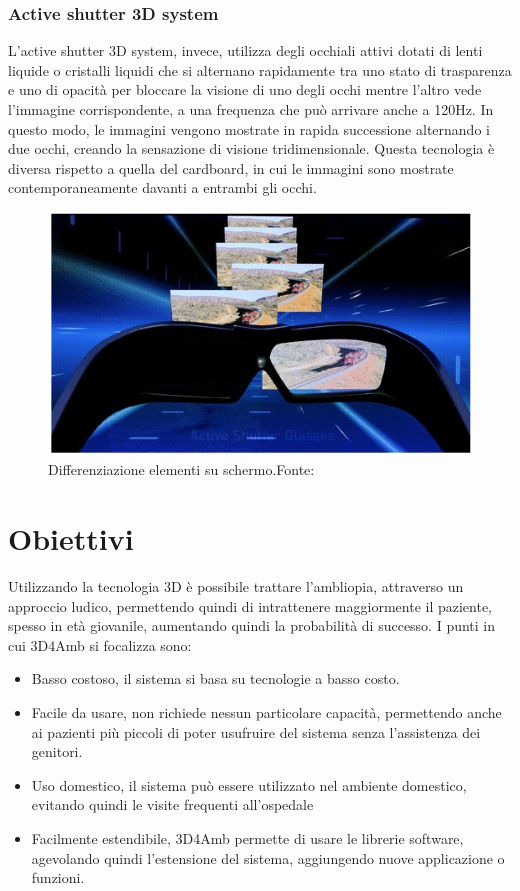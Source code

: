 \documentclass[
a4paper,
cleardoublepage=empty,
headings=twolinechapter,
numbers=autoenddot,
]{scrbook}
\begin{document}
	\subsubsection{Active shutter 3D system}
	   L'active shutter 3D system, invece, utilizza degli occhiali attivi dotati di lenti liquide o cristalli liquidi che si alternano rapidamente tra uno stato di trasparenza e uno di opacità per bloccare la visione di uno degli occhi mentre l'altro vede l'immagine corrispondente, a una frequenza che può arrivare anche a 120Hz. In questo modo, le immagini vengono mostrate in rapida successione alternando i due occhi, creando la sensazione di visione tridimensionale. Questa tecnologia è diversa rispetto a quella del cardboard, in cui le immagini sono mostrate contemporaneamente davanti a entrambi gli occhi.
		\begin{figure}[H]
		\centering
		\includegraphics[width=0.6\linewidth]{image/active-shutter-3d-technology}
		\caption{Differenziazione elementi su schermo.Fonte:\cite{active-shutter-3d_image}}
		\label{fig:occhiali active-shutter-3d-technology}
	\end{figure}

	\section{Obiettivi}
	Utilizzando la tecnologia 3D è possibile trattare l'ambliopia, attraverso un approccio ludico, permettendo quindi di intrattenere maggiormente il paziente, spesso in età giovanile, aumentando quindi la probabilità di successo.
	I punti in cui 3D4Amb si focalizza sono:
	\begin{itemize}
		\item Basso costoso, il sistema si basa su tecnologie a basso costo.
		\item Facile da usare, non richiede nessun particolare capacità, permettendo anche ai pazienti più piccoli di poter usufruire del sistema senza l'assistenza dei genitori.
		\item Uso domestico, il sistema può essere utilizzato nel ambiente domestico, evitando quindi le visite frequenti all'ospedale
		\item Facilmente estendibile, 3D4Amb permette di usare le librerie software, agevolando  quindi l'estensione del sistema, aggiungendo nuove applicazione o funzioni.
	\end{itemize}
\end{document}
